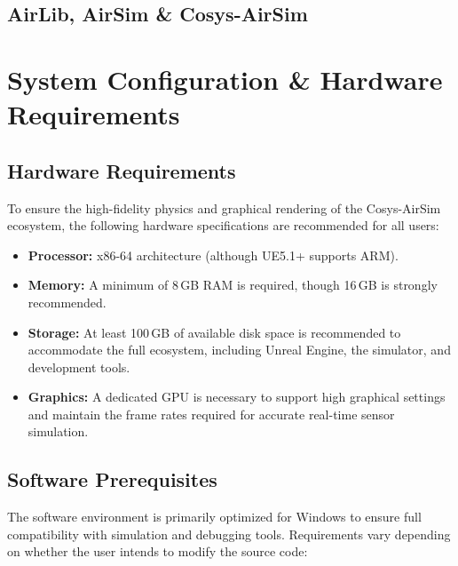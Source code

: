 \documentclass{article}
\begin{document}
\subsection{AirLib, AirSim \& Cosys-AirSim}
\noindent


\newpage

\section{System Configuration \& Hardware Requirements}
\label{sec:requirements}
\subsection{Hardware Requirements}
\noindent
To ensure the high-fidelity physics and graphical rendering of the Cosys-AirSim ecosystem, the following hardware specifications are recommended for all users:

\begin{itemize}
    \item \textbf{Processor:} x86-64 architecture (although UE5.1+ supports ARM).
    \item \textbf{Memory:} A minimum of 8\,GB RAM is required, though 16\,GB is strongly recommended.
    \item \textbf{Storage:} At least 100\,GB of available disk space is recommended to accommodate the full ecosystem, including Unreal Engine, the simulator, and development tools.
    \item \textbf{Graphics:} A dedicated GPU is necessary to support high graphical settings and maintain the frame rates required for accurate real-time sensor simulation.
\end{itemize}

\subsection{Software Prerequisites}
\noindent
The software environment is primarily optimized for Windows to ensure full compatibility with simulation and debugging tools. Requirements vary depending on whether the user intends to modify the source code:
\end{document}
